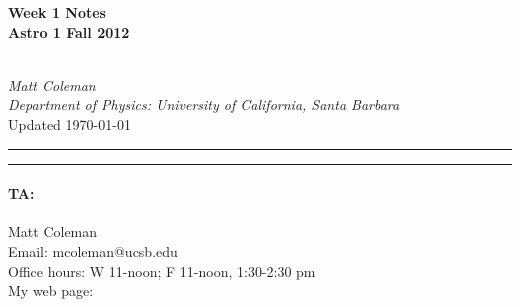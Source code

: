 \documentclass{article}
\begin{document}
\cfoot{\thepage}

\begin{centering}
	
	\begin{large}\textbf{Week 1 Notes\\
	Astro 1 Fall 2012}\end{large}\vspace{7pt}\\
	\textit{Matt Coleman \\
	Department of Physics: University of California, Santa Barbara}\vspace{5pt}\\
	Updated \today\vspace{14pt}
	
\end{centering}	

\hrule\vspace{2pt} \hrule
\paragraph*{TA:}Matt Coleman\\
Email: mcoleman@ucsb.edu\\
Office hours: W 11-noon; F 11-noon, 1:30-2:30 pm\\
My web page: \\


\end{document}

